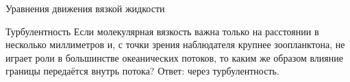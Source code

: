 \begin{chapter}{Уравнения движения вязкой жидкости}
\begin{section}{Турбулентность}\label{sec:turbulence}
Если молекулярная вязкость важна только 
на расстоянии в несколько миллиметров и, с точки зрения наблюдателя 
крупнее зоопланктона, не играет роли в большинстве океанических потоков,
то каким же образом влияние границы передаётся внутрь потока? 
Ответ: через турбулентность.
%


\end{section}
\end{chapter}
